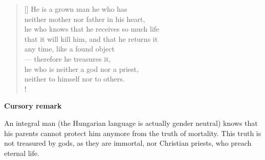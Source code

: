 \documentclass[a4paper,12pt,twoside,final]{book}
\begin{document}
\newpage


\settowidth{\versewidth}{he who knows that he receives so much life}

\begin{verse}[\versewidth]
  He is a grown man he who has \\
  neither mother nor father in his heart, \\
  he who knows that he receives so much life \\
  that it will kill him, and that he returns it \\
  any time, like a found object \\
  --- therefore he treasures it, \\
  he who is neither a god nor a priest, \\
  neither to himself nor to others. \\!
\end{verse}


\bigskip

\noindent \textbf{Cursory remark}

\medskip

An integral man (the Hungarian language is actually gender neutral)
knows that his parents cannot protect him anymore from the truth of
mortality. This truth is not treasured by gods, as they are immortal,
nor Christian priests, who preach eternal life.

\newpage

\settowidth{\versewidth}{s mint talált tárgyat visszaadja}
\end{document}
